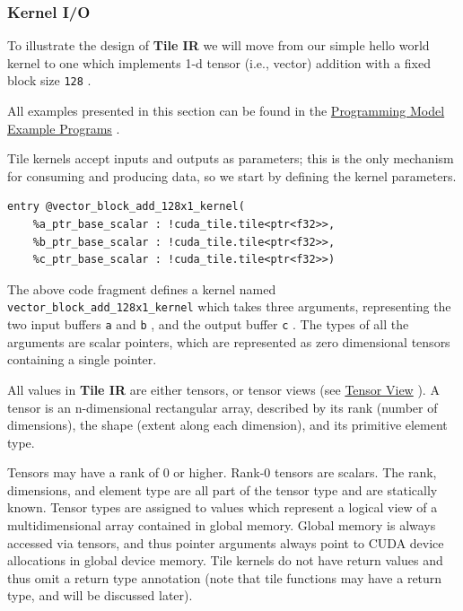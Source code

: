\documentclass{article}
\begin{document}
\subsubsection{Kernel I/O}

To illustrate the design of \textbf{Tile IR} we will move from our simple hello world kernel to one which implements 1-d tensor (i.e., vector) addition with a fixed block size \texttt{128} .

All examples presented in this section can be found in the \href{https://docs.nvidia.com/cuda/tile-ir/latest/sections/appendix.html#section-appendix-sub-prog}{Programming Model Example Programs} .


Tile kernels accept inputs and outputs as parameters; this is the only mechanism for consuming and producing data, so we start by defining the kernel parameters.


\begin{lstlisting}
entry @vector_block_add_128x1_kernel(
    %a_ptr_base_scalar : !cuda_tile.tile<ptr<f32>>,
    %b_ptr_base_scalar : !cuda_tile.tile<ptr<f32>>,
    %c_ptr_base_scalar : !cuda_tile.tile<ptr<f32>>)
\end{lstlisting}

The above code fragment defines a kernel named \texttt{vector\_block\_add\_128x1\_kernel} which takes three arguments, representing the two input buffers \texttt{a} and \texttt{b} , and the output buffer \texttt{c} . The types of all the arguments are scalar pointers, which are represented as zero dimensional tensors containing a single pointer.


All values in \textbf{Tile IR} are either tensors, or tensor views (see \href{https://docs.nvidia.com/cuda/tile-ir/latest/sections/types.html#type-views}{Tensor View} ). A tensor is an n-dimensional rectangular array, described by its rank (number of dimensions), the shape (extent along each dimension), and its primitive element type.

Tensors may have a rank of 0 or higher. Rank-0 tensors are scalars. The rank, dimensions, and element type are all part of the tensor type and are statically known. Tensor types are assigned to values which represent a logical view of a multidimensional array contained in global memory. Global memory is always accessed via tensors, and thus pointer arguments always point to CUDA device allocations in global device memory. Tile kernels do not have return values and thus omit a return type annotation (note that tile functions may have a return type, and will be discussed later).
\end{document}

